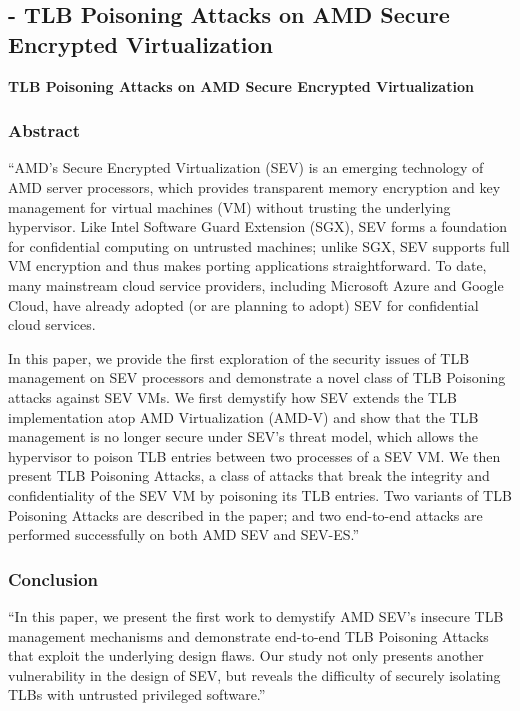 
\subsection{\cite{li_tlb_2021} - TLB Poisoning Attacks on AMD Secure Encrypted Virtualization}

\textbf{TLB Poisoning Attacks on AMD Secure Encrypted Virtualization }

\subsubsection*{Abstract \cite{li_tlb_2021}}
“AMD’s Secure Encrypted Virtualization (SEV) is an emerging technology of AMD server processors, which provides transparent memory encryption and key management for virtual machines (VM) without trusting the underlying hypervisor. Like Intel Software Guard Extension (SGX), SEV forms a foundation for confidential computing on untrusted machines; unlike SGX, SEV supports full VM encryption and thus makes porting applications straightforward. To date, many mainstream cloud service providers, including Microsoft Azure and Google Cloud, have already adopted (or are planning to adopt) SEV for confidential cloud services.

In this paper, we provide the first exploration of the security issues of TLB management on SEV processors and demonstrate a novel class of TLB Poisoning attacks against SEV VMs. We first demystify how SEV extends the TLB implementation atop AMD Virtualization (AMD-V) and show that the TLB management is no longer secure under SEV’s threat model, which allows the hypervisor to poison TLB entries between two processes of a SEV VM. We then present TLB Poisoning Attacks, a class of attacks that break the integrity and confidentiality of the SEV VM by poisoning its TLB entries. Two variants of TLB Poisoning Attacks are described in the paper; and two end-to-end attacks are performed successfully on both AMD SEV and SEV-ES.” 


\subsubsection*{Conclusion \cite{li_tlb_2021}}
“In this paper, we present the first work to demystify AMD SEV’s insecure TLB management mechanisms and demonstrate end-to-end TLB Poisoning Attacks that exploit the underlying design flaws. Our study not only presents another vulnerability in the design of SEV, but reveals the difficulty of securely isolating TLBs with untrusted privileged software.”

